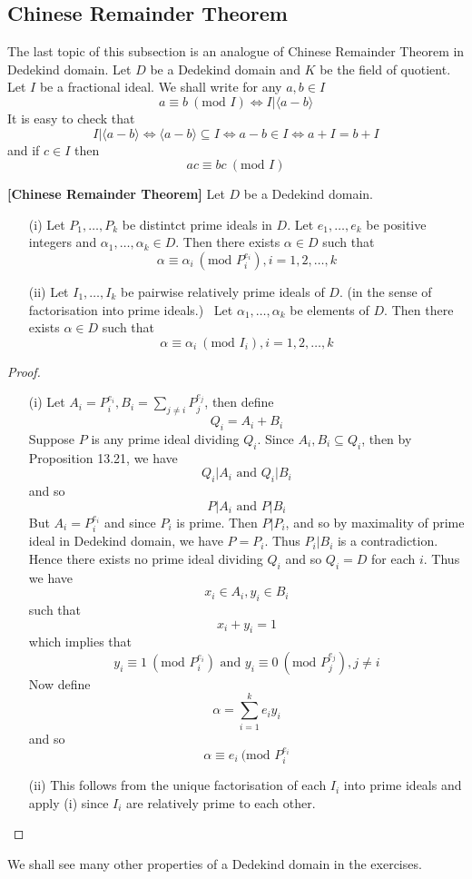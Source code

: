 \subsection{Chinese Remainder Theorem}
The last topic of this subsection is an analogue of Chinese Remainder Theorem in Dedekind domain.
Let $D$ be a Dedekind domain and $K$ be the field of quotient. Let $I$ be a fractional ideal. We shall write
for any $a,b \in I$
$$a \equiv b~(\text{mod } I) \iff I| \langle a-b \rangle$$
It is easy to check that
$$I| \langle a-b \rangle \iff \langle a-b \rangle \subseteq I \iff a-b \in I \iff a+I=b+I$$
and if $c \in I$ then
$$ac \equiv bc~(\text{mod } I)$$
\begin{theorem}{\bf [Chinese Remainder Theorem]}\label{C;Chinese Remainder theorem Dedekind}
Let $D$ be a Dedekind domain.
\begin{enumerate}
\item[(i)] Let $P_1,\ldots,P_k$ be distintct prime ideals in $D$. Let $e_1,\ldots,e_k$ be positive integers and $\alpha_1,\ldots,\alpha_k \in D$. Then there exists $\alpha \in D$ such that $$\alpha \equiv \alpha_i~(\text{mod }P^{e_i}_i), i=1,2,\ldots,k$$
\item[(ii)] Let $I_1,\ldots,I_k$ be pairwise relatively prime ideals of $D$. (in the sense of factorisation into prime ideals.) \ Let $\alpha_1,\ldots,\alpha_k$ be elements of $D$. Then there exists $\alpha \in D$ such that
$$\alpha \equiv \alpha_i~(\text{mod }I_i),i=1,2,\ldots,k$$
\end{enumerate}
\end{theorem}
\begin{proof}
\begin{enumerate}
\item[(i)] Let $A_i=P^{e_i}_i, B_i=\sum_{j \neq i} P^{e_j}_j$, then define
$$Q_i=A_i+B_i$$
Suppose $P$ is any prime ideal dividing $Q_i$. Since $A_i,B_i \subseteq Q_i$, then by Proposition
13.21, we have
$$Q_i \big| A_i \text{ and } Q_i \big| B_i$$
and so
$$P \big|A_i \text{ and } P\big| B_i$$
But $A_i=P^{e_i}_i$ and since $P_i$ is prime. Then $P \big|P_i$, and so by maximality of prime ideal in Dedekind domain, we have $P=P_i$. Thus $P_i \big| B_i$ is a contradiction. Hence there exists no prime ideal dividing $Q_i$
and so $Q_i=D$ for each $i$.
Thus we have
$$x_i \in A_i, y_i \in B_i$$
such that
$$x_i+y_i=1$$
which implies that
$$y_i \equiv 1~(\text{mod } P^{e_i}_i) \text{ and } y_i \equiv 0~(\text{mod } P^{e_j}_j), j \neq i$$
Now define
$$\alpha=\sum_{i=1}^k e_iy_i$$
and so
$$\alpha \equiv e_i ~(\text{mod } P^{e_i}_i$$
\item[(ii)] This follows from the unique factorisation of each $I_i$ into prime ideals and apply (i) since $I_i$ are relatively prime to each other.
\end{enumerate}
\end{proof}
We shall see many other properties of a Dedekind domain in the exercises.
